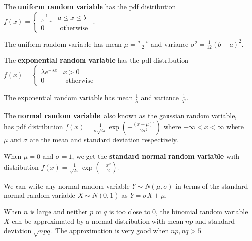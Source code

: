 \begin{defn}    
    The \textbf{uniform random variable} has the pdf distribution $f(x) = \begin{cases} \frac{1}{b-a} & a \leq x \leq b \\ 0 & \text { otherwise }\end{cases}$.
\end{defn}

\begin{prop}
The uniform random variable has mean $\mu = \frac{a + b}{2}$ and variance $\sigma^2 = \frac{1}{12} (b-a)^2$.
\end{prop}

\begin{defn}
    The \textbf{exponential random variable} has the pdf distribution $f(x) = \begin{cases} \lambda e^{-\lambda x} & x > 0 \\ 0 & \text{ otherwise } \end{cases}$
\end{defn}

\begin{prop}
The exponential random variable has mean $\frac{1}{\lambda}$ and variance $\frac{1}{\lambda^2}$.
\end{prop}

\begin{defn}
    The \textbf{normal random variable}, also known as the gaussian random variable, has pdf distribution $f(x) = \displaystyle \frac{1}{\sigma \sqrt{2 \pi}}  \exp\left(\displaystyle - \frac{(x-\mu)^2}{2 \sigma^2}\right)$ where $-\infty < x < \infty$ where $\mu$ and $\sigma$ are the mean and standard deviation respectively.
\end{defn}

\begin{defn}
When $\mu = 0$ and $\sigma = 1$, we get the \textbf{standard normal random variable} with distribution $f(x) = \displaystyle\frac{1}{\sqrt{2\pi}} \exp(-\frac{x^2}{2})$.
\end{defn}

We can write any normal random variable $Y \sim N(\mu, \sigma)$ in terms of the standard normal random variable $X \sim N(0,1)$ as $Y = \sigma X + \mu$.

\begin{prop}
    When $n$ is large and neither $p$ or $q$ is too close to $0$, the binomial random variable $X$ can be approximated by a normal distribution with mean $np$ and standard deviation $\sqrt{npq}$. The approximation is very good when $np, nq > 5$.
\end{prop}

